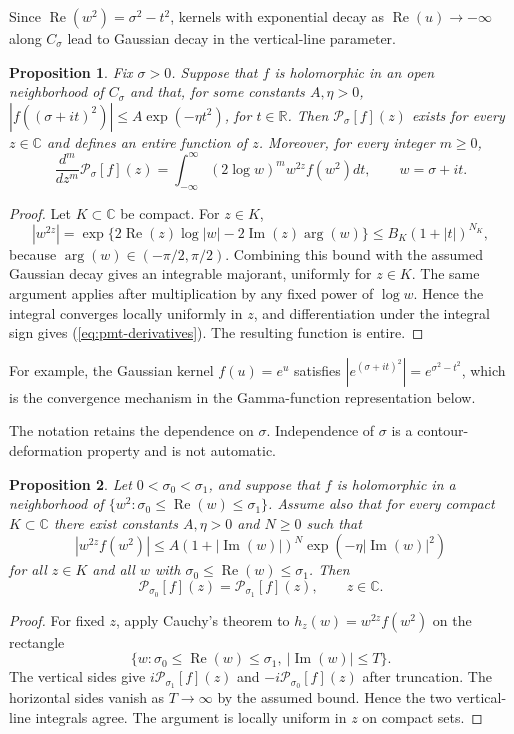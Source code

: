 \documentclass[12pt,english]{article}
\theoremstyle{plain} %
\newtheorem{proposition}{Proposition}
\theoremstyle{remark} %
\begin{document}
Since $\operatorname{Re}(w^2)=\sigma^2-t^2$, kernels with exponential decay as $\operatorname{Re}(u)\to-\infty$ along $C_\sigma$ lead to Gaussian decay in the vertical-line parameter.

\begin{proposition}
\label{prop:pmt-entire}
Fix $\sigma>0$. Suppose that $f$ is holomorphic in an open neighborhood of $C_\sigma$ and that, for some constants $A,\eta>0$, $|f((\sigma+it)^2)|\leq A\exp(-\eta t^2)$, for $t\in\mathbb{R}$. 
Then $\mathcal{P}_\sigma[f](z)$ exists for every $z\in\mathbb{C}$ and defines an entire function of $z$. Moreover, for every integer $m\geq0$,
\begin{equation}
\frac{d^m}{dz^m}\mathcal{P}_\sigma[f](z)
=
\int_{-\infty}^{\infty}
(2\log w)^m w^{2z}f(w^2)dt,
\qquad w=\sigma+it.
\label{eq:pmt-derivatives}
\end{equation}
\end{proposition}

\begin{proof}
Let $K\subset\mathbb{C}$ be compact. For $z\in K$,
$$
|w^{2z}|
=
\exp\{2\operatorname{Re}(z)\log|w|-2\operatorname{Im}(z)\arg(w)\}
\leq B_K(1+|t|)^{N_K},
$$
because $\arg(w)\in(-\pi/2,\pi/2)$. Combining this bound with the assumed Gaussian decay gives an integrable
majorant, uniformly for $z\in K$. The same argument applies after multiplication by any fixed power of $\log w$. Hence the integral converges locally uniformly in $z$, and differentiation under the integral sign gives (\ref{eq:pmt-derivatives}). The resulting function is entire.
\end{proof}

For example, the Gaussian kernel $f(u)=e^u$ satisfies $|e^{(\sigma+it)^2}|=e^{\sigma^2-t^2}$, which is the convergence mechanism in the Gamma-function representation below.

The notation retains the dependence on $\sigma$. Independence of $\sigma$ is a contour-deformation property and is not automatic.

\begin{proposition}
\label{prop:pmt-contour-deformation}
Let $0<\sigma_0<\sigma_1$, and suppose that $f$ is holomorphic in a neighborhood of
$\{w^2:\sigma_0\leq\operatorname{Re}(w)\leq\sigma_1\}$. Assume also that for every compact $K\subset\mathbb{C}$ there exist constants $A,\eta>0$ and $N\geq0$ such that
$$
|w^{2z}f(w^2)|
\leq
A(1+|\operatorname{Im}(w)|)^N
\exp(-\eta|\operatorname{Im}(w)|^2)
$$
for all $z\in K$ and all $w$ with $\sigma_0\leq\operatorname{Re}(w)\leq\sigma_1$. Then
$$
\mathcal{P}_{\sigma_0}[f](z)=\mathcal{P}_{\sigma_1}[f](z),
\qquad z\in\mathbb{C}.
$$
\end{proposition}
\begin{proof}
For fixed $z$, apply Cauchy's theorem to $h_z(w)=w^{2z}f(w^2)$ on the rectangle
$$
\{w:\sigma_0\leq\operatorname{Re}(w)\leq\sigma_1,\ |\operatorname{Im}(w)|\leq T\}.
$$
The vertical sides give $i\mathcal{P}_{\sigma_1}[f](z)$ and $-i\mathcal{P}_{\sigma_0}[f](z)$ after truncation. The horizontal sides vanish as $T\to\infty$ by the assumed bound. Hence the two vertical-line integrals agree. The argument is locally uniform in $z$ on compact sets.
\end{proof}
\end{document}
